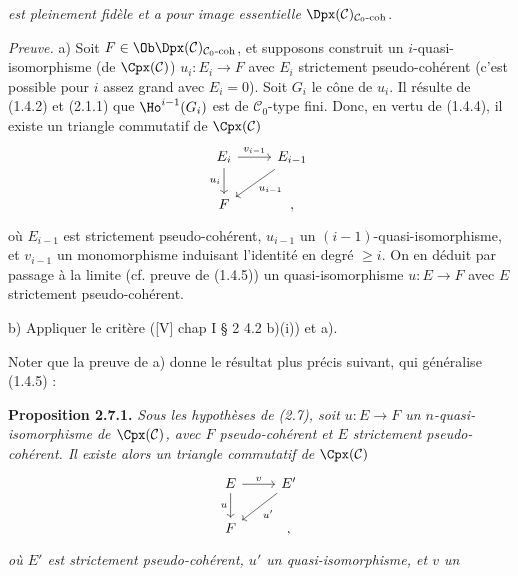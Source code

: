 \emph{est
pleinement fidèle et a pour image essentielle} \(\Dpx(\mathcal C)_{\mathcal C_0\text{-}\mathrm{coh}}\).

\emph{Preuve.} a) Soit \(F\in\Ob\Dpx(\mathcal C)_{\mathcal C_0\text{-}\mathrm{coh}}\), et supposons construit un \(i\)-quasi-isomorphisme (de \(\Cpx(\mathcal C)\)) \(u_i:E_i\longrightarrow F\) avec \(E_i\) strictement pseudo-cohérent (c'est possible pour \(i\) assez grand avec \(E_i=0\)). Soit \(G_i\) le cône de \(u_i\). Il résulte de (1.4.2) et (2.1.1) que \(\Ho^{i-1}(G_i)\) est de \(\mathcal C_0\)-type fini. Donc, en vertu de (1.4.4), il existe un triangle commutatif de \(\Cpx(\mathcal C)\)
\[
\begin{tikzcd}
E_i \arrow[r,"v_{i-1}"] \arrow[d,"u_i"'] & E_{i-1} \arrow[dl,"u_{i-1}"]\\
F & ,
\end{tikzcd}
\]
où \(E_{i-1}\) est strictement pseudo-cohérent, \(u_{i-1}\) un \((i-1)\)-quasi-isomorphisme, et \(v_{i-1}\) un monomorphisme induisant l'identité en degré \(\geq i\). On en déduit par passage à la limite (cf. preuve de (1.4.5)) un quasi-isomorphisme \(u:E\to F\) avec \(E\) strictement pseudo-cohérent.

b) Appliquer le critère ([V] chap I § 2 4.2 b)(i)) et a).

Noter que la preuve de a) donne le résultat plus précis suivant, qui généralise (1.4.5) :

\textbf{Proposition 2.7.1.} \emph{Sous les hypothèses de (2.7), soit \(u:E\to F\) un \(n\)-quasi-isomorphisme de \(\Cpx(\mathcal C)\), avec \(F\) pseudo-cohérent et \(E\) strictement pseudo-cohérent. Il existe alors un triangle commutatif de} \(\Cpx(\mathcal C)\)
\[
\begin{tikzcd}
E \arrow[r,"v"] \arrow[d,"u"'] & E' \arrow[dl,"u'"]\\
F & ,
\end{tikzcd}
\]
\emph{où \(E'\) est strictement pseudo-cohérent, \(u'\) un quasi-isomorphisme, et \(v\) un}
